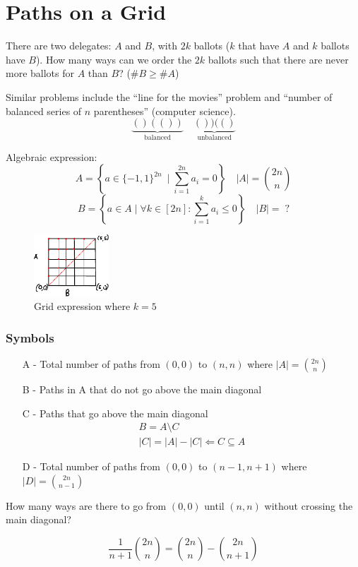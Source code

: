 \documentclass[00_complete]{subfiles}
\begin{document}
\section{Paths on a Grid}
\begin{example}
There are two delegates: $A$ and $B$, with $2k$ ballots ($k$ that have $A$ and
$k$ ballots have $B$). How many ways can we order the $2k$ ballots such that
there are never more ballots for $A$ than $B$? ($\# B \geq \# A$)

Similar problems include the ``line for the movies'' problem and ``number of
balanced series of $n$ parentheses'' (computer science).
$$\underbrace{()(())}_{\text{balanced}} \quad
\underbrace{())(()}_{\text{unbalanced}}$$

\end{example}
Algebraic expression:
$$A = \left\{a \in \{-1,1\}^{2n}\ \mid \sum_{i=1}^{2n} a_i = 0\right\} \quad |A|=\binom{2n}{n}$$
$$B=\left\{a \in A \mid \forall k \in [2n]: \sum_{i=1}^k a_i \leq 0\right\}
\quad |B|=\;?$$

\begin{figure}[ht]
  \centering
    \includegraphics[width=0.25\textwidth]{w6-grid}
    \caption{Grid expression where $k=5$}
\end{figure}

\subsubsection{Symbols}
\begin{itemize}
    \item[A -] Total number of paths from $(0,0)$ to $(n,n)$ where $|A| = \binom{2n}{n}$
    \item[B -] Paths in A that do not go above the main diagonal
    \item[C -] Paths that go above the main diagonal
    $$
    \begin{gathered}
        B = A \setminus C \\
        |C| = |A| - |C| \Leftarrow C \subseteq A
    \end{gathered}
    $$
    \item[D -]Total number of paths from $(0,0)$ to $(n-1,n+1)$ where $|D|=\binom{2n}{n-1}$
\end{itemize}
\begin{claim}
How many ways are there to go from $(0,0)$ until $(n,n)$ without crossing the
main diagonal?

$$\frac{1}{n+1} \binom{2n}{n} = \binom{2n}{n} - \binom{2n}{n+1}$$
\end{claim}
\end{document}
